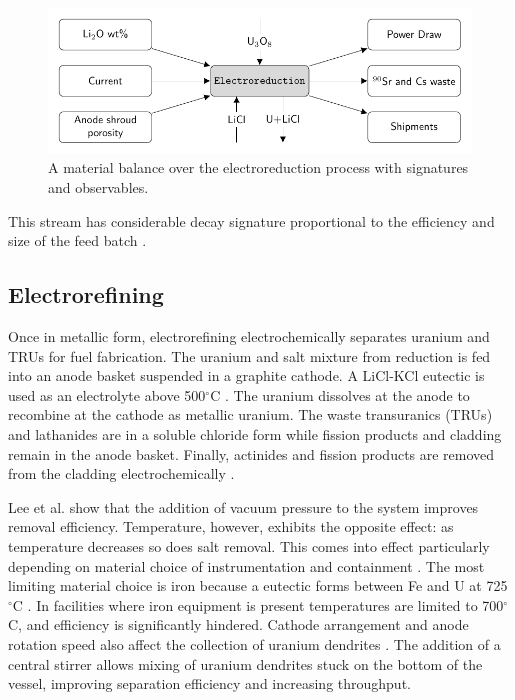 \documentclass{anstrans}
\begin{document}
\begin{figure}[ht]
	\centering
	\includegraphics[width=1\linewidth]{reduction}
	\caption{A material balance over the electroreduction process with signatures and observables.}
	\label{fig:reduction}
\end{figure}

This stream has considerable decay signature proportional to the efficiency and size of the feed batch \cite{Borrelli_2017,flowsheet_1998}.

\subsection{Electrorefining}

Once in metallic form, electrorefining electrochemically separates uranium and TRUs for fuel fabrication.
The uranium and salt mixture from reduction is fed into an anode basket suspended in a graphite cathode. A LiCl-KCl eutectic is used as 
an electrolyte above 500$^{\circ}$C \cite{flowsheet_1998,lee_korean_2011}. The uranium dissolves at the anode to recombine at 
the cathode as metallic uranium. The waste transuranics (TRUs) and lathanides are in a soluble chloride form  while fission 
products and cladding remain in the anode basket. Finally, actinides and fission products are removed from the cladding 
electrochemically \cite{lee_korean_2011}.

Lee et al. \cite{lee_advanced_2008} show that the addition of vacuum pressure to the system improves removal efficiency. 
Temperature, however, exhibits the opposite effect: as temperature decreases so does salt removal. This comes into effect 
particularly depending on material choice of instrumentation and containment \cite{lee_advanced_2008}. The most limiting 
material choice is iron because a eutectic forms between Fe and U at 725$^{\circ}$C \cite{chapman_revision_1984}. 
In facilities where iron equipment is present temperatures are limited to 700$^{\circ}$C, and efficiency is 
significantly hindered. Cathode arrangement and anode rotation speed also affect the collection of uranium 
dendrites \cite{lee_advanced_2008}. The addition of a central stirrer allows mixing of uranium dendrites stuck on 
the bottom of the vessel, improving separation efficiency and increasing throughput. 
\end{document}
